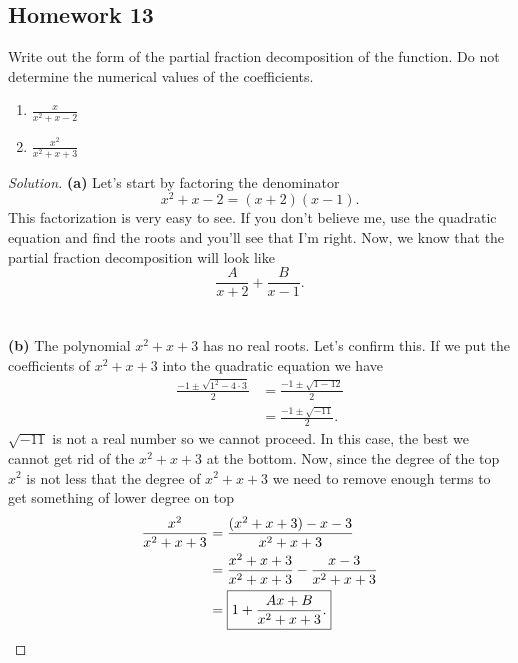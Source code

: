 \subsection{Homework 13}
\begin{problem}[WebAssign, HW 13, \# 1]
Write out the form of the partial fraction decomposition of the
function. Do not determine the numerical values of the coefficients.
\begin{enumerate}[label=(\alph*)]
\item $\displaystyle\frac{x}{x^2+x-2}$
\item $\displaystyle\frac{x^2}{x^2+x+3}$
\end{enumerate}
\end{problem}
\begin{proof}[Solution]
\textbf{(a)} Let's start by factoring the denominator
\[
x^2+x-2=(x+2)(x-1).
\]
This factorization is very easy to see. If you don't believe me, use the
quadratic equation and find the roots and you'll see that I'm right. Now,
we know that the partial fraction decomposition will look like
\[
\boxed{\frac{A}{x+2}+\frac{B}{x-1}.}
\]
\\\\
\textbf{(b)} The polynomial $x^2+x+3$ has no real roots. Let's confirm
this. If we put the coefficients of $x^2+x+3$ into the quadratic equation
we have
\begin{align*}
\frac{-1\pm\sqrt{1^2-4\cdot 3}}{2}
&=\frac{-1\pm\sqrt{1-12}}{2}\\
&=\frac{-1\pm\sqrt{-11}}{2}.
\end{align*}
$\sqrt{-11}$ is not a real number so we cannot proceed. In this case, the
best we cannot get rid of the $x^2+x+3$ at the bottom. Now, since the
degree of the top $x^2$ is not less that the degree of $x^2+x+3$ we need to
remove enough terms to get something of lower degree on top
\begin{align*}
\frac{x^2}{x^2+x+3}
&=\frac{(x^2+x+3)-x-3}{x^2+x+3}\\
&=\frac{x^2+x+3}{x^2+x+3}-\frac{x-3}{x^2+x+3}\\
&=\boxed{1+\frac{Ax+B}{x^2+x+3}.}\qedhere
\end{align*}
\end{proof}

